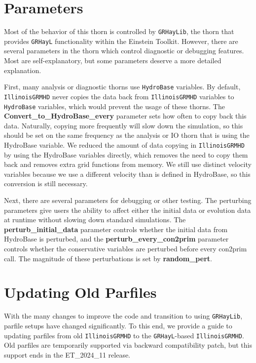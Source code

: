 \documentclass{article}
\newcommand{\grhayl}{\texttt{GRHayL}\xspace}
\newcommand{\glib}{\texttt{GRHayLib}\xspace}
\newcommand{\igm}{\texttt{IllinoisGRMHD}\xspace}
\newcommand{\hydrobase}{\texttt{HydroBase}\xspace}
\begin{document}
\section{Parameters}

Most of the behavior of this thorn is controlled by \glib,
the thorn that provides \grhayl functionality
within the Einstein Toolkit. However, there are several
parameters in the thorn which control diagnostic or debugging
features. Most are self-explanatory, but some parameters deserve
a more detailed explanation.

First, many analysis or diagnostic thorns use \hydrobase variables.
By default, \igm never copies the data back from \igm variables
to \hydrobase variables, which would prevent the usage of these
thorns. The \textbf{Convert\_to\_HydroBase\_every} parameter
sets how often to copy back this data. Naturally, copying more
frequently will slow down the simulation, so this should be set
on the same frequency as the analysis or IO thorn that is using
the HydroBase variable. We reduced the amount of data copying in \igm
by using the HydroBase variables directly, which removes the need
to copy them back and removes extra grid functions from memory.
We still use distinct velocity variables because we use a different
velocity than is defined in HydroBase, so this conversion is still
necessary.

Next, there are several parameters for debugging or other testing.
The perturbing parameters give users the ability to affect either
the initial data or evolution data at runtime without slowing down
standard simulations. The \textbf{perturb\_initial\_data} parameter
controls whether the initial data from HydroBase is perturbed, and
the \textbf{perturb\_every\_con2prim} parameter controls whether
the conservative variables are perturbed before every con2prim call.
The magnitude of these perturbations is set by \textbf{random\_pert}.

\section{Updating Old Parfiles}

With the many changes to improve the code and transition to using \glib,
parfile setups have changed significantly. To this end, we provide a
guide to updating parfiles from old \igm to the \grhayl-based \igm.
Old parfiles are temporarily supported via backward compatibility
patch, but this support ends in the ET\_2024\_11 release.
\end{document}

